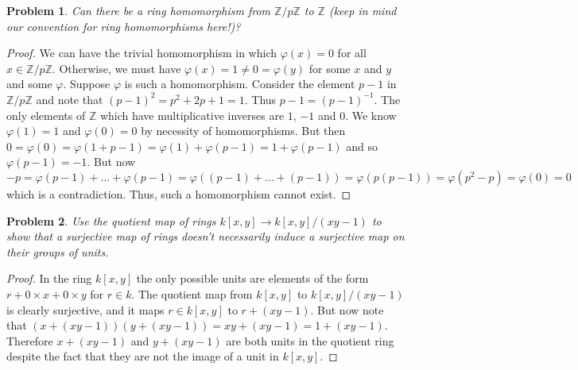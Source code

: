 \documentclass{article}
\newtheorem{problem}{Problem}
\begin{document}
\begin{problem}
Can there be a ring homomorphism from $\mathbb{Z}/p\mathbb{Z}$ to $\mathbb{Z}$ (keep in mind our convention for ring homomorphisms here!)?
\end{problem}
\begin{proof}
We can have the trivial homomorphism in which $\varphi(x) = 0$ for all $x \in \mathbb{Z}/p\mathbb{Z}$. Otherwise, we must have $\varphi(x) = 1 \neq 0 = \varphi(y)$ for some $x$ and $y$ and some $\varphi$. Suppose $\varphi$ is such a homomorphism. Consider the element $p-1$ in $\mathbb{Z}/p\mathbb{Z}$ and note that $(p-1)^2 = p^2 + 2p + 1 = 1$. Thus $p-1 = (p-1)^{-1}$. The only elements of $\mathbb{Z}$ which have multiplicative inverses are $1$, $-1$ and $0$. We know $\varphi(1) = 1$ and $\varphi(0) = 0$ by necessity of homomorphisms. But then $0 = \varphi(0) = \varphi(1 + p-1) = \varphi(1) + \varphi(p-1) = 1 + \varphi(p-1)$ and so $\varphi(p-1) = -1$. But now
\[
-p = \varphi(p-1) + \dots +\varphi(p-1) = \varphi((p-1) + \dots + (p-1)) = \varphi(p(p-1)) = \varphi(p^2 - p) = \varphi(0) = 0
\]
which is a contradiction. Thus, such a homomorphism cannot exist.
\end{proof}

\begin{problem}
Use the quotient map of rings $k[x,y] \to k[x,y]/(xy-1)$ to show that a surjective map of rings doesn't necessarily induce a surjective map on their groups of units.
\end{problem}
\begin{proof}
In the ring $k[x,y]$ the only possible units are elements of the form $r + 0 \times x + 0 \times y$ for $r \in k$. The quotient map from $k[x,y]$ to $k[x,y]/(xy-1)$ is clearly surjective, and it maps $r \in k[x,y]$ to $r + (xy-1)$. But now note that $(x + (xy-1))(y + (xy-1)) = xy + (xy-1) = 1 + (xy-1)$. Therefore $x + (xy-1)$ and $y + (xy-1)$ are both units in the quotient ring despite the fact that they are not the image of a unit in $k[x,y]$.
\end{proof}
\end{document}
